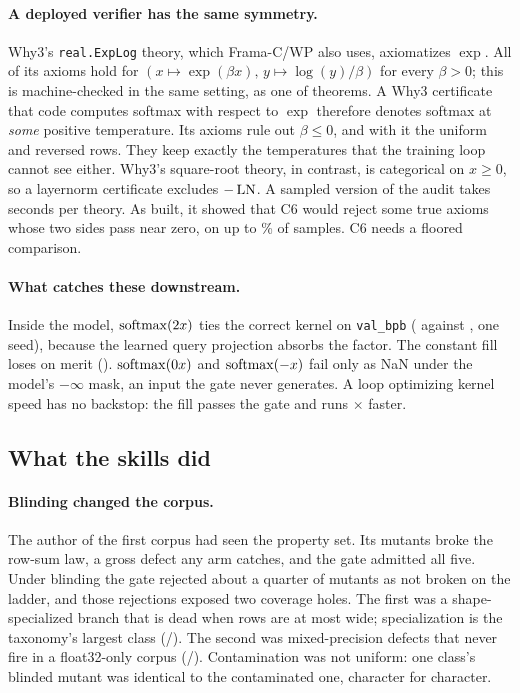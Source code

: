 \paragraph{A deployed verifier has the same symmetry.}
Why3's \texttt{real.ExpLog} theory, which Frama-C/WP also uses, axiomatizes $\exp$. All
\whyExpAxioms{} of its axioms hold for $(x \mapsto \exp(\beta x),\, y \mapsto \log(y)/\beta)$
for every $\beta > 0$; this is machine-checked in the same setting, as one of
\whyTheorems{} theorems. A Why3 certificate that code computes softmax with respect to
$\exp$ therefore denotes softmax at \emph{some} positive temperature. Its axioms rule out
$\beta \le 0$, and with it the uniform and reversed rows. They keep exactly the
temperatures that the training loop cannot see either. Why3's square-root theory, in
contrast, is categorical on $x \ge 0$, so a layernorm certificate excludes $-\operatorname{LN}$. A
sampled version of the audit takes seconds per theory. As built, it showed that C6 would
reject some true axioms whose two sides pass near zero, on up to
\cSixFalseRejectMax\% of samples. C6 needs a floored comparison.

\paragraph{What catches these downstream.}
Inside the model, $\operatorname{softmax}(2x)$ ties the correct kernel on \texttt{val\_bpb}
(\bpbBetaTwo{} against \bpbCorrect{}, one seed), because the learned query projection
absorbs the factor. The constant fill loses on merit (\bpbFill). $\operatorname{softmax}(0x)$ and
$\operatorname{softmax}(-x)$ fail only as NaN under the model's $-\infty$ mask, an input the gate never
generates. A loop optimizing kernel speed has no backstop: the fill passes the gate and
runs \fillSpeedup$\times$ faster.

\subsection{What the skills did}
\label{sec:skills-results}

\paragraph{Blinding changed the corpus.}
The author of the first corpus had seen the property set. Its mutants broke the row-sum
law, a gross defect any arm catches, and the gate admitted all five. Under blinding the
gate rejected about a quarter of mutants as not broken on the ladder, and those
rejections exposed two coverage holes. The first was a shape-specialized branch that is
dead when rows are at most \ladderWidestRow{} wide; specialization is the taxonomy's
largest class (\isstaSpecialization/\isstaBugs). The second was mixed-precision defects
that never fire in a float32-only corpus (\isstaDtype/\isstaBugs). Contamination was not
uniform: one class's blinded mutant was identical to the contaminated one, character for
character.

